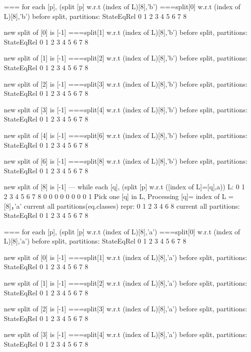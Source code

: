 === for each [p], (split [p] w.r.t (index of L)[8],'b')
===split[0] w.r.t (index of L)[8],'b')
before split, partitions:
StateEqRel
{ 0 }
{ 1 }
{ 2 }
{ 3 }
{ 4  5 }
{ 6  7 }
{ 8 }

new split of [0] is [-1]
===split[1] w.r.t (index of L)[8],'b')
before split, partitions:
StateEqRel
{ 0 }
{ 1 }
{ 2 }
{ 3 }
{ 4  5 }
{ 6  7 }
{ 8 }

new split of [1] is [-1]
===split[2] w.r.t (index of L)[8],'b')
before split, partitions:
StateEqRel
{ 0 }
{ 1 }
{ 2 }
{ 3 }
{ 4  5 }
{ 6  7 }
{ 8 }

new split of [2] is [-1]
===split[3] w.r.t (index of L)[8],'b')
before split, partitions:
StateEqRel
{ 0 }
{ 1 }
{ 2 }
{ 3 }
{ 4  5 }
{ 6  7 }
{ 8 }

new split of [3] is [-1]
===split[4] w.r.t (index of L)[8],'b')
before split, partitions:
StateEqRel
{ 0 }
{ 1 }
{ 2 }
{ 3 }
{ 4  5 }
{ 6  7 }
{ 8 }

new split of [4] is [-1]
===split[6] w.r.t (index of L)[8],'b')
before split, partitions:
StateEqRel
{ 0 }
{ 1 }
{ 2 }
{ 3 }
{ 4  5 }
{ 6  7 }
{ 8 }

new split of [6] is [-1]
===split[8] w.r.t (index of L)[8],'b')
before split, partitions:
StateEqRel
{ 0 }
{ 1 }
{ 2 }
{ 3 }
{ 4  5 }
{ 6  7 }
{ 8 }

new split of [8] is [-1]
--- while each [q], (split [p] w.r.t ([index of L]=[q],a))
L:
0 1 2 3 4 5 6 7 8
0 0 0 0 0 0 0 0 1
Pick one [q] in L, Processing [q]= index of L = [8]，'a'
current all partitions(eq.classes) repr:
{ 0  1  2  3  4  6  8 }
current all partitions:
StateEqRel
{ 0 }
{ 1 }
{ 2 }
{ 3 }
{ 4  5 }
{ 6  7 }
{ 8 }

=== for each [p], (split [p] w.r.t (index of L)[8],'a')
===split[0] w.r.t (index of L)[8],'a')
before split, partitions:
StateEqRel
{ 0 }
{ 1 }
{ 2 }
{ 3 }
{ 4  5 }
{ 6  7 }
{ 8 }

new split of [0] is [-1]
===split[1] w.r.t (index of L)[8],'a')
before split, partitions:
StateEqRel
{ 0 }
{ 1 }
{ 2 }
{ 3 }
{ 4  5 }
{ 6  7 }
{ 8 }

new split of [1] is [-1]
===split[2] w.r.t (index of L)[8],'a')
before split, partitions:
StateEqRel
{ 0 }
{ 1 }
{ 2 }
{ 3 }
{ 4  5 }
{ 6  7 }
{ 8 }

new split of [2] is [-1]
===split[3] w.r.t (index of L)[8],'a')
before split, partitions:
StateEqRel
{ 0 }
{ 1 }
{ 2 }
{ 3 }
{ 4  5 }
{ 6  7 }
{ 8 }

new split of [3] is [-1]
===split[4] w.r.t (index of L)[8],'a')
before split, partitions:
StateEqRel
{ 0 }
{ 1 }
{ 2 }
{ 3 }
{ 4  5 }
{ 6  7 }
{ 8 }

